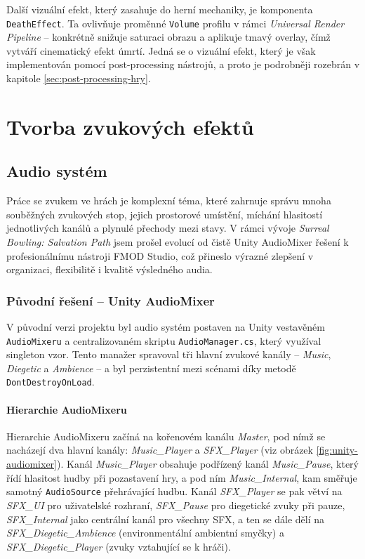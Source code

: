 Další vizuální efekt, který zasahuje do herní mechaniky, je komponenta \texttt{DeathEffect}. Ta ovlivňuje proměnné \texttt{Volume} profilu v rámci \emph{Universal Render Pipeline} -- konkrétně snižuje saturaci obrazu a aplikuje tmavý overlay, čímž vytváří cinematický efekt úmrtí. Jedná se o vizuální efekt, který je však implementován pomocí post-processing nástrojů, a proto je podrobněji rozebrán v kapitole \ref{sec:post-processing-hry}.

\section{Tvorba zvukových efektů}
\label{sec:tvorba-zvukovych-efektu}

\subsection{Audio systém}
\label{sec:audio-system}

Práce se zvukem ve hrách je komplexní téma, které zahrnuje správu mnoha souběžných zvukových stop, jejich prostorové umístění, míchání hlasitostí jednotlivých kanálů a plynulé přechody mezi stavy. V rámci vývoje \emph{Surreal Bowling: Salvation Path} jsem prošel evolucí od čistě Unity AudioMixer řešení k profesionálnímu nástroji FMOD Studio, což přineslo výrazné zlepšení v organizaci, flexibilitě i kvalitě výsledného audia.

\subsubsection{Původní řešení -- Unity AudioMixer}
\label{sec:puvodni-audiomixer}

V původní verzi projektu byl audio systém postaven na Unity vestavěném \texttt{AudioMixeru} a centralizovaném skriptu \texttt{AudioManager.cs}, který využíval singleton vzor. Tento manažer spravoval tři hlavní zvukové kanály -- \emph{Music}, \emph{Diegetic} a \emph{Ambience} -- a byl perzistentní mezi scénami díky metodě \texttt{DontDestroyOnLoad}.

\paragraph{Hierarchie AudioMixeru}
Hierarchie AudioMixeru začíná na kořenovém kanálu \emph{Master}, pod nímž se nacházejí dva hlavní kanály: \emph{Music\_Player} a \emph{SFX\_Player} (viz obrázek \ref{fig:unity-audiomixer}). Kanál \emph{Music\_Player} obsahuje podřízený kanál \emph{Music\_Pause}, který řídí hlasitost hudby při pozastavení hry, a pod ním \emph{Music\_Internal}, kam směřuje samotný \texttt{AudioSource} přehrávající hudbu. Kanál \emph{SFX\_Player} se pak větví na \emph{SFX\_UI} pro uživatelské rozhraní, \emph{SFX\_Pause} pro diegetické zvuky při pauze, \emph{SFX\_Internal} jako centrální kanál pro všechny SFX, a ten se dále dělí na \emph{SFX\_Diegetic\_Ambience} (environmentální ambientní smyčky) a \emph{SFX\_Diegetic\_Player} (zvuky vztahující se k hráči).

